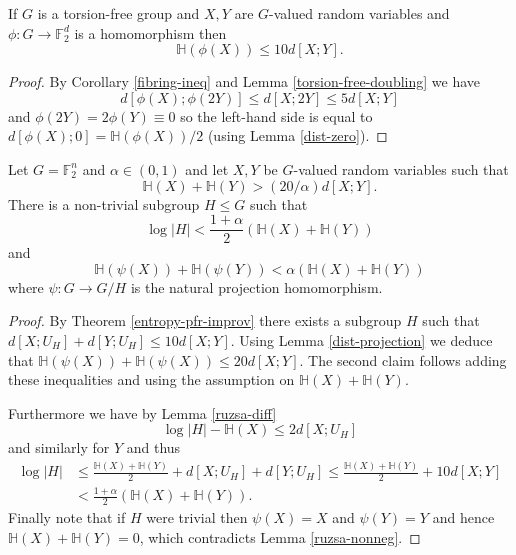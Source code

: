\begin{lemma}\label{torsion-dist-shrinking}\leanok
If $G$ is a torsion-free group and $X,Y$ are $G$-valued random variables and $\phi:G\to \mathbb{F}_2^d$ is a homomorphism then
\[\mathbb{H}(\phi(X))\leq 10d[X;Y].\]
\end{lemma}
\begin{proof}
\leanok
By Corollary \ref{fibring-ineq} and Lemma \ref{torsion-free-doubling} we have
\[d[\phi(X);\phi(2Y)]\leq d[X;2Y]\leq 5d[X;Y]\]
and $\phi(2Y)=2\phi(Y)\equiv 0$ so the left-hand side is equal to $d[\phi(X);0]=\mathbb{H}(\phi(X))/2$ (using Lemma \ref{dist-zero}).
\end{proof}

\begin{lemma}\label{app-ent-pfr}\leanok
Let $G=\mathbb{F}_2^n$ and $\alpha\in (0,1)$ and let $X,Y$ be $G$-valued
random variables such that
\[\mathbb{H}(X)+\mathbb{H}(Y)> (20/\alpha) d[X;Y].\]
There is a non-trivial subgroup $H\leq G$ such that
\[\log \lvert H\rvert <\frac{1+\alpha}{2}(\mathbb{H}(X)+\mathbb{H}(Y))\] and
\[\mathbb{H}(\psi(X))+\mathbb{H}(\psi(Y))< \alpha (\mathbb{H}(X)+\mathbb{H}(Y))\]
where $\psi:G\to G/H$ is the natural projection homomorphism.
\end{lemma}
\begin{proof}
\leanok
By Theorem \ref{entropy-pfr-improv} there exists a subgroup $H$ such that
$d[X;U_H] + d[Y;U_H] \leq 10 d[X;Y]$. Using Lemma \ref{dist-projection} we
deduce that $\mathbb{H}(\psi(X)) + \mathbb{H}(\psi(X)) \leq 20 d[X;Y]$. The
second claim follows adding these inequalities and using the assumption on
$\mathbb{H}(X)+\mathbb{H}(Y)$.

Furthermore we have by Lemma \ref{ruzsa-diff}
\[\log \lvert H \rvert-\mathbb{H}(X)\leq 2d[X;U_H]\]
and similarly for $Y$ and thus
\begin{align*}
\log \lvert  H\rvert
&\leq
\frac{\mathbb{H}(X)+\mathbb{H}(Y)}{2}+d[X;U_H] + d[Y;U_H] \leq
\frac{\mathbb{H}(X)+\mathbb{H}(Y)}{2}+ 10d[X;Y]
\\& <
\frac{1+\alpha}{2}(\mathbb{H}(X)+\mathbb{H}(Y)).
\end{align*}
Finally note that if $H$
were trivial then $\psi(X)=X$ and $\psi(Y)=Y$ and hence
$\mathbb{H}(X)+\mathbb{H}(Y)=0$, which contradicts Lemma \ref{ruzsa-nonneg}.
\end{proof}


